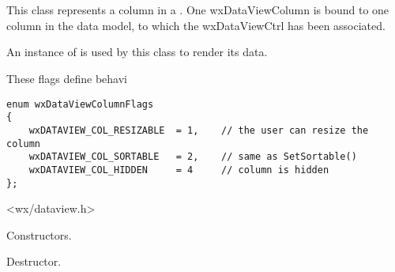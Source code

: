 
\section{}\label{wxdataviewcolumn}


This class represents a column in a .
One wxDataViewColumn is bound to one column in the data model,
to which the wxDataViewCtrl has been associated. 

An instance of  is used by
this class to render its data.


These flags define behavi

{\small
\begin{verbatim}
enum wxDataViewColumnFlags
{
    wxDATAVIEW_COL_RESIZABLE  = 1,    // the user can resize the column
    wxDATAVIEW_COL_SORTABLE   = 2,    // same as SetSortable()
    wxDATAVIEW_COL_HIDDEN     = 4     // column is hidden
};
\end{verbatim}
}




<wx/dataview.h>




\label{wxdataviewcolumnwxdataviewcolumn}




Constructors.


\label{wxdataviewcolumndtor}


Destructor.

\label{wxdataviewcolumngetbitmap}

